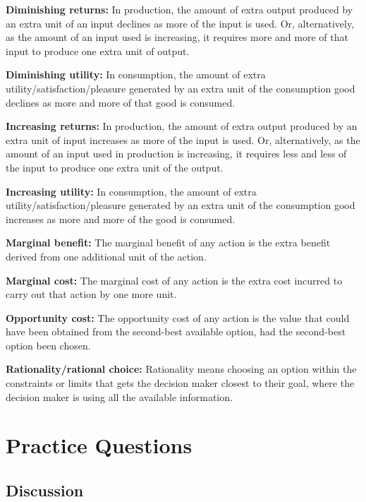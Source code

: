 \documentclass[
]{book}
\begin{document}
\textbf{Diminishing returns:} In production, the amount of extra output produced by an extra unit of an input declines as more of the input is used. Or, alternatively, as the amount of an input used is increasing, it requires more and more of that input to produce one extra unit of output.

\textbf{Diminishing utility:} In consumption, the amount of extra utility/satisfaction/pleasure generated by an extra unit of the consumption good declines as more and more of that good is consumed.

\textbf{Increasing returns:} In production, the amount of extra output produced by an extra unit of input increases as more of the input is used. Or, alternatively, as the amount of an input used in production is increasing, it requires less and less of the input to produce one extra unit of the output.

\textbf{Increasing utility:} In consumption, the amount of extra utility/satisfaction/pleasure generated by an extra unit of the consumption good increases as more and more of the good is consumed.

\textbf{Marginal benefit:} The marginal benefit of any action is the extra benefit derived from one additional unit of the action.

\textbf{Marginal cost:} The marginal cost of any action is the extra cost incurred to carry out that action by one more unit.

\textbf{Opportunity cost:} The opportunity cost of any action is the value that could have been obtained from the second-best available option, had the second-best option been chosen.

\textbf{Rationality/rational choice:} Rationality means choosing an option within the constraints or limits that gets the decision maker closest to their goal, where the decision maker is using all the available information.

\hypertarget{practice-questions-1}{%
\section{Practice Questions}\label{practice-questions-1}}

\hypertarget{discussion-1}{%
\subsection{Discussion}\label{discussion-1}}
\end{document}
